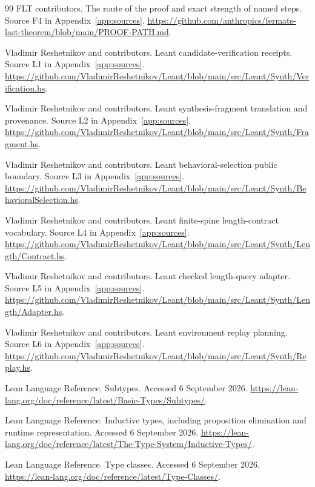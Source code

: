 \documentclass[11pt,a4paper]{article}
\theoremstyle{plain}
\theoremstyle{definition}
\begin{document}
\begin{thebibliography}{99}
 FLT contributors. The route of the proof and exact strength of named steps. Source F4 in Appendix~\ref{app:sources}. \url{https://github.com/anthropics/fermats-last-theorem/blob/main/PROOF-PATH.md}.

 Vladimir Reshetnikov and contributors. Leant candidate-verification receipts. Source L1 in Appendix~\ref{app:sources}. \url{https://github.com/VladimirReshetnikov/Leant/blob/main/src/Leant/Synth/Verification.hs}.

 Vladimir Reshetnikov and contributors. Leant synthesis-fragment translation and provenance. Source L2 in Appendix~\ref{app:sources}. \url{https://github.com/VladimirReshetnikov/Leant/blob/main/src/Leant/Synth/Fragment.hs}.

 Vladimir Reshetnikov and contributors. Leant behavioral-selection public boundary. Source L3 in Appendix~\ref{app:sources}. \url{https://github.com/VladimirReshetnikov/Leant/blob/main/src/Leant/Synth/BehavioralSelection.hs}.

 Vladimir Reshetnikov and contributors. Leant finite-spine length-contract vocabulary. Source L4 in Appendix~\ref{app:sources}. \url{https://github.com/VladimirReshetnikov/Leant/blob/main/src/Leant/Synth/Length/Contract.hs}.

 Vladimir Reshetnikov and contributors. Leant checked length-query adapter. Source L5 in Appendix~\ref{app:sources}. \url{https://github.com/VladimirReshetnikov/Leant/blob/main/src/Leant/Synth/Length/Adapter.hs}.

 Vladimir Reshetnikov and contributors. Leant environment replay planning. Source L6 in Appendix~\ref{app:sources}. \url{https://github.com/VladimirReshetnikov/Leant/blob/main/src/Leant/Synth/Replay.hs}.

 Lean Language Reference. Subtypes. Accessed 6 September 2026. \url{https://lean-lang.org/doc/reference/latest/Basic-Types/Subtypes/}.

 Lean Language Reference. Inductive types, including proposition elimination and runtime representation. Accessed 6 September 2026. \url{https://lean-lang.org/doc/reference/latest/The-Type-System/Inductive-Types/}.

 Lean Language Reference. Type classes. Accessed 6 September 2026. \url{https://lean-lang.org/doc/reference/latest/Type-Classes/}.


\end{thebibliography}
\end{document}
